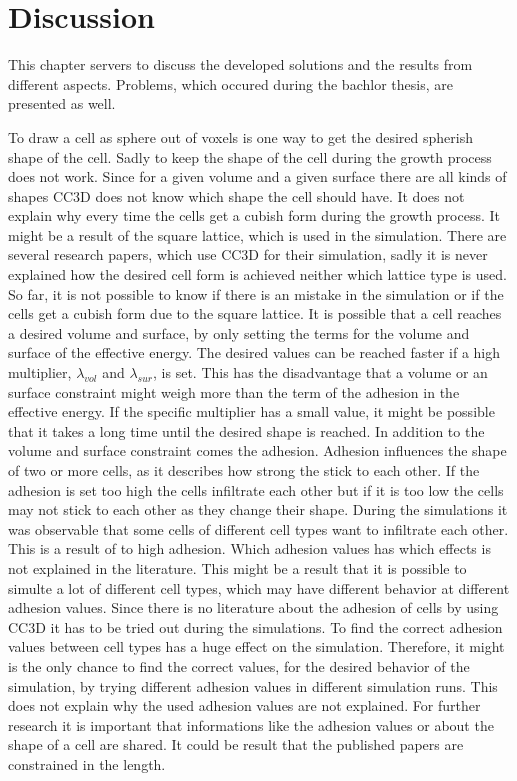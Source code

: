 \chapter{Discussion}
This chapter servers to discuss the developed solutions and the results from different aspects. Problems, which occured during the bachlor thesis, are presented as well.

To draw a cell as sphere out of voxels is one way to get the desired spherish shape of the cell. Sadly to keep the shape of the cell during the growth process does not work. Since for a given volume and a given surface there are all kinds of shapes \ac{CC3D} does not know which shape the cell should have. It does not explain why every time the cells get a cubish form during the growth process. It might be a result of the square lattice, which is used in the simulation. There are several research papers, which use \ac{CC3D} for their simulation, sadly it is never explained how the desired cell form is achieved neither which lattice type is used. So far, it is not possible to know if there is an mistake in the simulation or if the cells get a cubish form due to the square lattice. \newline
It is possible that a cell reaches a desired volume and surface, by only setting the terms for the volume and surface of the effective energy. The desired values can be reached faster if a high multiplier, $\lambda_{vol}$ and $\lambda_{sur}$, is set. This has the disadvantage that a volume or an surface constraint might weigh more than the term of the adhesion in the effective energy. If the specific multiplier has a small value, it might be possible that it takes a long time until the desired shape is reached. In addition to the volume and surface constraint comes the adhesion. Adhesion influences the shape of two or more cells, as it describes how strong the stick to each other. If the adhesion is set too high the cells infiltrate each other but if it is too low the cells may not stick to each other as they change their shape. During the simulations it was observable that some cells of different cell types want to infiltrate each other. This is a result of to high adhesion. Which adhesion values has which effects is not explained in the literature. This might be a result that it is possible to simulte a lot of different cell types, which may have different behavior at different adhesion values. Since there is no literature about the adhesion of cells by using \ac{CC3D} it has to be tried out during the simulations. To find the correct adhesion values between cell types has a huge effect on the simulation. Therefore, it might is the only chance to find the correct values, for the desired behavior of the simulation, by trying different adhesion values in different simulation runs. This does not explain why the used adhesion values are not explained. For further research it is important that informations like the adhesion values or about the shape of a cell are shared. It could be result that the published papers are constrained in the length.


